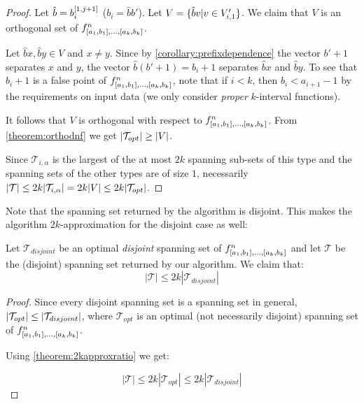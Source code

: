 \begin{proof}
Let $\hat{b} = b_i^{[1, j+1]}$ ($b_i = \hat{b} b'$).
Let $V = \{\hat{b} v | v \in V_{i, 1}'\}$.
We claim that $V$ is an orthogonal set of
$f^{n}_{[a_1, b_1], \ldots, [a_{k}, b_{k}]}$.

Let $\hat{b} x, \hat{b} y \in V$
and $x \neq y$.
Since by \cref{corollary:prefixdependence}
the vector $b'+1$ separates $x$ and $y$,
the vector $\hat{b} (b'+1) = b_i+1$ separates
$\hat{b} x$ and $\hat{b} y$.
To see that $b_i+1$ is a false point of $f^{n}_{[a_1, b_1], \ldots, [a_{k}, b_{k}]}$,
note that if $i<k$,
then $b_i < a_{i+1} - 1$
by the requirements on input data
(we only consider \emph{proper} $k$-interval functions).

It follows that $V$ is orthogonal
with respect to $f^{n}_{[a_1, b_1], \ldots, [a_{k}, b_{k}]}$.
From \cref{theorem:orthodnf} we get
$\lvert\mathcal{T}_{opt}\rvert \geq \lvert V\rvert$.

Since $\mathcal{T}_{i, \alpha}$ is
the largest of the at most $2k$ spanning sub-sets
of this type
and the spanning sets of the other types are of size $1$,
necessarily
$\lvert\mathcal{T}\rvert \leq 2k \lvert\mathcal{T}_{i, \alpha}\rvert
= 2k \lvert V\rvert \leq 2k \lvert\mathcal{T}_{opt}\rvert$.
\end{proof}

Note that the spanning set returned by the algorithm
is disjoint.
This makes the algorithm $2k$-approximation
for the disjoint case as well:

\begin{theorem}
Let $\mathcal{T}_{disjoint}$ be an optimal \emph{disjoint}
spanning set of
$f^n_{[a_1, b_1], \ldots, [a_k, b_k]}$
and let $\mathcal{T}$ be the (disjoint)
spanning set returned by our algorithm.
We claim that:
\begin{equation*}
|\mathcal{T}| \leq 2k |\mathcal{T}_{disjoint}|
\end{equation*}
\end{theorem}

\begin{proof}
Since every disjoint spanning set
is a spanning set in general,
$\lvert\mathcal{T}_{opt}\rvert \leq
\lvert\mathcal{T}_{disjoint}\rvert$,
where $\mathcal{T}_{opt}$ is an optimal
(not necessarily disjoint)
spanning set of
$f^n_{[a_1, b_1], \ldots, [a_k, b_k]}$.

Using \cref{theorem:2kapproxratio} we get:

\begin{equation*}
|\mathcal{T}| \leq 2k |\mathcal{T}_{opt}|
\leq 2k |\mathcal{T}_{disjoint}|
\end{equation*}
\end{proof}


